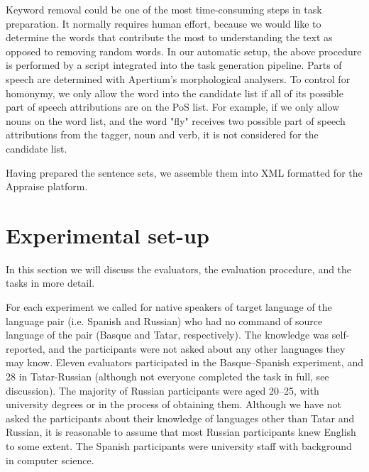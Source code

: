 \documentclass[11pt]{article}
\newcommand{\comment}[1]{}
\begin{document}
Keyword removal could be one of the most time-consuming steps in task preparation. It normally requires human effort, because we would like to determine the words that contribute the most to understanding the text as opposed to removing random words. In our automatic setup, the above procedure is performed by a script integrated into the task generation pipeline. Parts of speech are determined with Apertium's morphological analysers. To control for homonymy, we only allow the word into the candidate list if all of its possible part of speech attributions are on the PoS list. For example, if we only allow nouns on the word list, and the word "fly" receives two possible part of speech attributions from the tagger, noun and verb, it is not considered for the candidate list.

Having prepared the sentence sets, we assemble them into XML formatted for the Appraise platform.

\section{Experimental set-up}
\label{sec:setup}

In this section we will discuss the evaluators, the evaluation procedure, and the tasks in more detail.

For each experiment we called for native speakers of target language of the language pair (i.e.
Spanish and Russian) who had no command of source language of the pair (Basque
and Tatar, respectively). The knowledge was self-reported, and the participants were not asked about any other languages they may know. \comment{EA 12: should I elaborate on this? Write that Basque is not mutually understandable with anything? I am pretty sure we had no one from Tatarstan, but there may have been someone who knows some Bashkir, which might have helped them. Also, with Tatar, I think, Russian loanwords help more than anything else. } Eleven evaluators participated in the Basque--Spanish experiment, and 28 in Tatar-Russian (although not everyone completed the task
in full, see discussion). The majority of Russian participants were aged 20--25, with university degrees or in the process of obtaining them. Although we have not asked the participants about their knowledge of languages other than Tatar and Russian, it is reasonable to assume that most Russian participants knew English to some extent. The Spanish participants were university staff with background in computer science.
\end{document}
